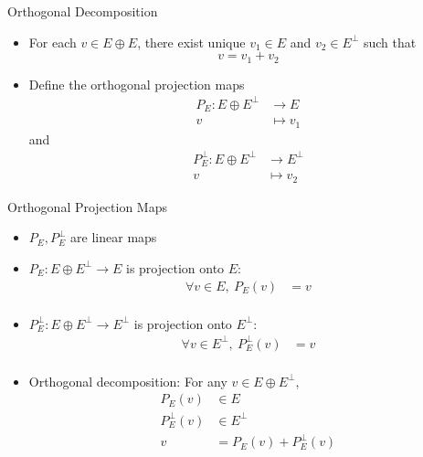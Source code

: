 \documentclass[usenames,dvipsnames,10pt]{beamer}
\begin{document}
\begin{frame}
  {Orthogonal Decomposition}

  \begin{itemize}
  \item For each $v \in E\oplus E$, there exist unique $v_1 \in E$ and $v_2\in E^\perp$ such that
    \[
      v = v_1 + v_2
    \]
  \item Define the orthogonal projection maps
    \begin{align*}
      P_E: E\oplus E^\perp &\rightarrow E\\
      v &\mapsto v_1
    \end{align*}
    and
    \begin{align*}
      P_E^\perp: E\oplus E^\perp &\rightarrow E^\perp\\
      v &\mapsto v_2
    \end{align*}
  \end{itemize}
\end{frame}

\begin{frame}
  {Orthogonal Projection Maps}

  \begin{itemize}
  \item $P_E, P^\perp_E$ are linear maps
  \item $P_E: E\oplus E^\perp \rightarrow E$ is projection onto $E$:
    \begin{align*}
      \forall v \in E,\ P_E(v) &= v\\
    \end{align*}
  \item $P^\perp_E: E\oplus E^\perp \rightarrow E^\perp$ is projection onto $E^\perp$:
    \begin{align*}
      \forall v \in E^\perp,\ P_E^\perp(v) &= v\\
    \end{align*}
  \item Orthogonal decomposition: For any $v \in E\oplus E^\perp$,
    \begin{align*}
      P_E(v) &\in E\\
      P^\perp_E(v) &\in E^\perp\\
      v &= P_E(v) + P^\perp_E(v)
    \end{align*}
  \end{itemize}
\end{frame}
\end{document}

